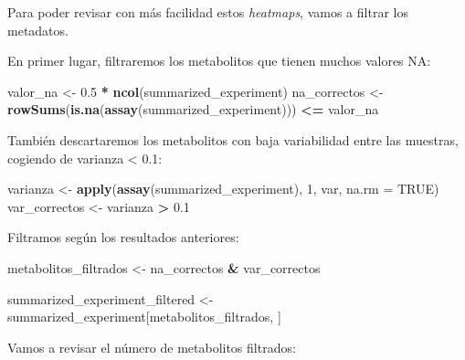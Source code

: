 \documentclass[
]{article}
\newenvironment{Shaded}{\begin{snugshade}}{\end{snugshade}}
\newcommand{\AttributeTok}[1]{\textcolor[rgb]{0.13,0.29,0.53}{#1}}
\newcommand{\ConstantTok}[1]{\textcolor[rgb]{0.56,0.35,0.01}{#1}}
\newcommand{\DecValTok}[1]{\textcolor[rgb]{0.00,0.00,0.81}{#1}}
\newcommand{\FloatTok}[1]{\textcolor[rgb]{0.00,0.00,0.81}{#1}}
\newcommand{\FunctionTok}[1]{\textcolor[rgb]{0.13,0.29,0.53}{\textbf{#1}}}
\newcommand{\NormalTok}[1]{#1}
\newcommand{\OtherTok}[1]{\textcolor[rgb]{0.56,0.35,0.01}{#1}}
\newcommand{\SpecialCharTok}[1]{\textcolor[rgb]{0.81,0.36,0.00}{\textbf{#1}}}
\begin{document}
Para poder revisar con más facilidad estos \emph{heatmaps}, vamos a
filtrar los metadatos.

En primer lugar, filtraremos los metabolitos que tienen muchos valores
NA:

\begin{Shaded}
\begin{Highlighting}[]
\NormalTok{valor\_na }\OtherTok{\textless{}{-}} \FloatTok{0.5} \SpecialCharTok{*} \FunctionTok{ncol}\NormalTok{(summarized\_experiment)}
\NormalTok{na\_correctos }\OtherTok{\textless{}{-}} \FunctionTok{rowSums}\NormalTok{(}\FunctionTok{is.na}\NormalTok{(}\FunctionTok{assay}\NormalTok{(summarized\_experiment))) }\SpecialCharTok{\textless{}=}\NormalTok{ valor\_na}
\end{Highlighting}
\end{Shaded}

También descartaremos los metabolitos con baja variabilidad entre las
muestras, cogiendo de varianza \textless{} 0.1:

\begin{Shaded}
\begin{Highlighting}[]
\NormalTok{varianza }\OtherTok{\textless{}{-}} \FunctionTok{apply}\NormalTok{(}\FunctionTok{assay}\NormalTok{(summarized\_experiment), }\DecValTok{1}\NormalTok{, var, }\AttributeTok{na.rm =} \ConstantTok{TRUE}\NormalTok{)}
\NormalTok{var\_correctos }\OtherTok{\textless{}{-}}\NormalTok{ varianza }\SpecialCharTok{\textgreater{}} \FloatTok{0.1}
\end{Highlighting}
\end{Shaded}

Filtramos según los resultados anteriores:

\begin{Shaded}
\begin{Highlighting}[]
\NormalTok{metabolitos\_filtrados }\OtherTok{\textless{}{-}}\NormalTok{ na\_correctos }\SpecialCharTok{\&}\NormalTok{ var\_correctos}
\end{Highlighting}
\end{Shaded}

\begin{Shaded}
\begin{Highlighting}[]
\NormalTok{summarized\_experiment\_filtered }\OtherTok{\textless{}{-}}\NormalTok{ summarized\_experiment[metabolitos\_filtrados, ]}
\end{Highlighting}
\end{Shaded}

Vamos a revisar el número de metabolitos filtrados:
\end{document}
